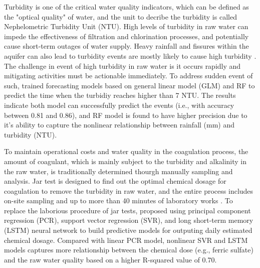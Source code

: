 Turbidity is one of the critical water quality indicators, which can be defined as the "optical quality" of water, and the unit to decribe the turbidity is called Nephelometric Turbidity Unit (NTU). High levels of turbidity in raw water can impede the effectiveness of filtration and chlorination processes, and potentially cause short-term outages of water supply. Heavy rainfall and fissures within the aquifer can also lead to turbidity events are mostly likely to cause high turbidity \citep{worldhealthorganizationWaterQualityHealth2017}. The challenge in event of high turbidity in raw water is it occurs rapidly and mitigating activities must be actionable immediately. To address sudden event of such, \citet{stevensonAdvancedTurbidityPrediction2019} trained forecasting models based on general linear model (GLM) and RF to predict the time when the turbidiy reaches higher than 7 NTU. The results indicate both model can successfully predict the events (i.e., with accuracy between 0.81 and 0.86), and RF model is found to have higher precision due to it's ability to capture the nonlinear relationship between rainfall (mm) and turbidity (NTU).

To maintain operational costs and water quality in the coagulation process, the amount of coagulant, which is mainly subject to the turbidity and alkalinity in the raw water, is traditionally determined thourgh manually sampling and analysis. Jar test is designed to find out the optimal chemical dosage for coagulation to remove the turbidity in raw water, and the entire process includes on-site sampling and up to more than 40 minutes of laboratory works \citep{ganiEffectPHAlum2017}. To replace the laborious procedure of jar tests, \citet{wangIntegratingWaterQuality2022} proposed using principal component regression (PCR), support vector regression (SVR), and long short-term memory (LSTM) neural network to build predictive models for outputing daily estimated chemical dosage. Compared with linear PCR model, nonlinear SVR and LSTM models captures more relationship between the chemical dose (e.g., ferric sulfate) and the raw water quality based on a higher R-squared value of 0.70.


